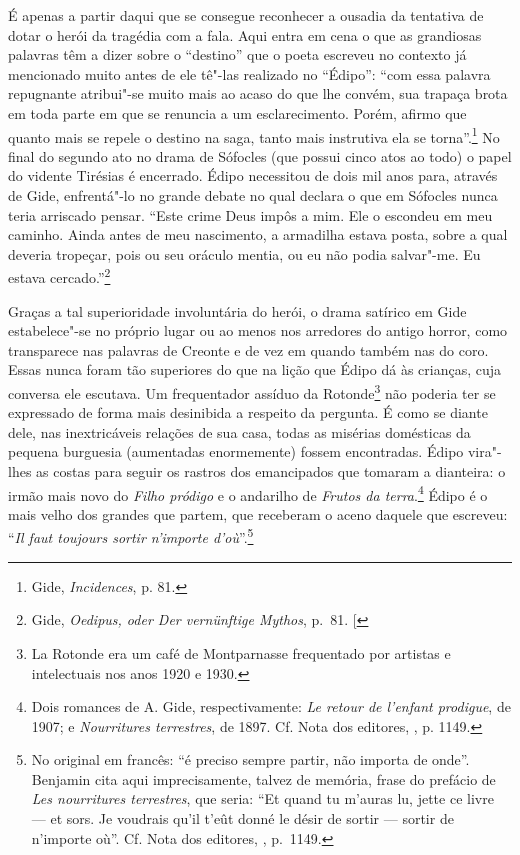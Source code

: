 É apenas a partir daqui que se consegue reconhecer a ousadia da
tentativa de dotar o herói da tragédia com a fala. Aqui entra em cena o
que as grandiosas palavras têm a dizer sobre o ``destino'' que o poeta
escreveu no contexto já mencionado muito antes de ele tê"-las realizado
no ``Édipo'': ``com essa palavra repugnante atribui"-se muito mais ao
acaso do que lhe convém, sua trapaça brota em toda parte em que se
renuncia a um esclarecimento. Porém, afirmo que quanto mais se repele o
destino na saga, tanto mais instrutiva ela se torna''.\footnote{Gide, \emph{Incidences}, p. 81. \versal{[N. T.]}} No final do segundo ato no drama de %
Sófocles (que possui cinco atos ao todo) o papel do vidente Tirésias é
encerrado. Édipo necessitou de dois mil anos para, através de Gide,
enfrentá"-lo no grande debate no qual declara o que em Sófocles nunca
teria arriscado pensar. ``Este crime Deus impôs a mim. Ele o escondeu em
meu caminho. Ainda antes de meu nascimento, a armadilha estava posta,
sobre a qual deveria tropeçar, pois ou seu oráculo mentia, ou eu não
podia salvar"-me. Eu estava cercado.''\footnote{Gide, \emph{Oedipus, oder Der vernünftige Mythos}, p.~81. {[}\versal{N. T.}{]}}

Graças a tal superioridade involuntária do herói, o drama satírico em
Gide estabelece"-se no próprio lugar ou ao menos nos arredores do antigo
horror, como transparece nas palavras de Creonte e de vez em quando
também nas do coro. Essas nunca foram tão superiores do que na lição que
Édipo dá às crianças, cuja conversa ele escutava. Um frequentador
assíduo da Rotonde\footnote{La Rotonde era um café de Montparnasse
  frequentado por artistas e intelectuais nos anos 1920 e 1930. \versal{[N. E.]}} não
poderia ter se expressado de forma mais desinibida a respeito da
pergunta. É como se diante dele, nas inextricáveis relações de sua
casa, todas as misérias domésticas da pequena burguesia (aumentadas
enormemente) fossem encontradas. Édipo vira"-lhes as costas para seguir
os rastros dos emancipados que tomaram a dianteira: o irmão mais novo do
\emph{Filho pródigo} e o andarilho de \emph{Frutos da terra}.\footnote{Dois romances de A. Gide, respectivamente: \emph{Le retour de l'enfant
  prodigue}, de 1907; e \emph{Nourritures terrestres}, de 1897. Cf. Nota
  dos editores, , p. 1149. \versal{[N. E.]}} Édipo é o
mais velho dos grandes que partem, que receberam o aceno daquele que
escreveu: ``\emph{Il faut toujours sortir n'importe d'où}''.\footnote{No original em francês: ``é preciso sempre partir, não importa de onde''.
  Benjamin cita aqui imprecisamente, talvez de memória, frase do
  prefácio de \emph{Les nourritures terrestres}, que seria: ``Et quand
  tu m'auras lu, jette ce livre --- et sors. Je voudrais qu'il t'eût
  donné le désir de sortir --- sortir de n'importe où''. Cf. Nota dos
  editores, , p.~1149. \versal{[N. T.]}}
